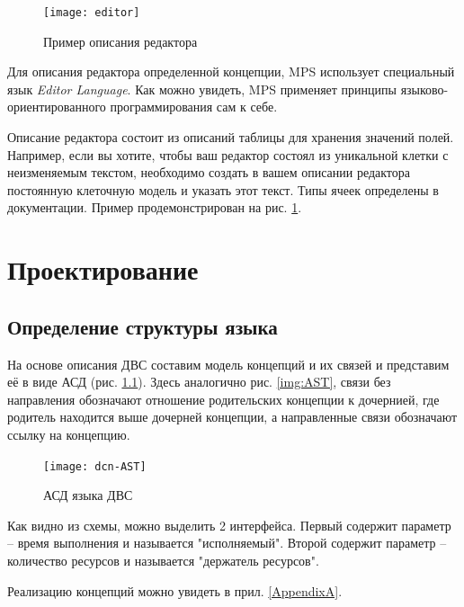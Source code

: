 		\begin{figure}[ht] 
			\center
			\texttt{[image: editor]}
			\caption{Пример описания редактора} 
			\label{img:editor}  
		\end{figure}
		
		Для описания редактора определенной концепции, MPS использует специальный язык \textit{Editor Language}. Как можно увидеть, MPS применяет принципы языково-ориентированного программирования сам к себе. 
		
		Описание редактора состоит из описаний таблицы для хранения значений полей. Например, если вы хотите, чтобы ваш редактор состоял из уникальной клетки с неизменяемым текстом, необходимо создать в вашем описании редактора постоянную клеточную модель и указать этот текст. Типы ячеек определены в документации. Пример продемонстрирован на рис. \ref{img:editor}.
		

		
\chapter{Проектирование}
	\section{Определение структуры языка}
		
		На основе описания ДВС составим модель концепций и их связей и представим её в виде АСД (рис. \ref{img:dcn-AST}). Здесь аналогично рис. \ref{img:AST}, связи без направления обозначают отношение родительских концепции к дочернией, где родитель находится выше дочерней концепции, а направленные связи обозначают ссылку на концепцию.
		
		\begin{figure}[ht] 
			\center
			\texttt{[image: dcn-AST]}
			\caption{АСД языка ДВС} 
			\label{img:dcn-AST}  
		\end{figure}
	
		Как видно из схемы, можно выделить 2 интерфейса. Первый содержит параметр -- время выполнения и называется "исполняемый". Второй содержит параметр -- количество ресурсов и называется "держатель ресурсов".
	
		Реализацию концепций можно увидеть в прил. \ref{AppendixA}.
		
		    
